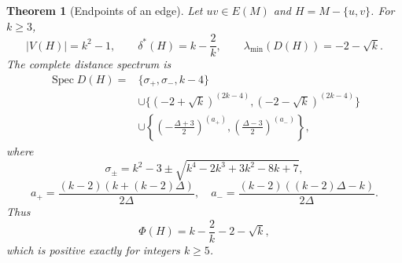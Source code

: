 \documentclass[a4paper,10pt,reqno]{amsart}
\theoremstyle{plain}
\newtheorem{theorem}{Theorem}[section]
\theoremstyle{definition}
\theoremstyle{remark}
\newcommand{\Spec}{\operatorname{Spec}}
\begin{document}
\begin{theorem}[Endpoints of an edge]\label{thm:edge-puncture}
Let \(uv\in E(M)\) and \(H=M-\{u,v\}\).  For \(k\ge3\),
\[
 |V(H)|=k^2-1,
 \qquad \delta^*(H)=k-\frac2k,
 \qquad \lambda_{\min}(D(H))=-2-\sqrt{k}.
\]
The complete distance spectrum is
\begin{align*}
\Spec D(H)={}&\{\sigma_+,\sigma_-,k-4\}\\
&\cup\{(-2+\sqrt{k})^{(2k-4)},(-2-\sqrt{k})^{(2k-4)}\}\\
&\cup\left\{\left(-\frac{\Delta+3}{2}\right)^{(a_+)},
\left(\frac{\Delta-3}{2}\right)^{(a_-)}\right\},
\end{align*}
where
\[
 \sigma_\pm=k^2-3\pm\sqrt{k^4-2k^3+3k^2-8k+7},
\]
\[
 a_+=\frac{(k-2)(k+(k-2)\Delta)}{2\Delta},
 \quad
 a_-=\frac{(k-2)((k-2)\Delta-k)}{2\Delta}.
\]
Thus
\[
 \Phi(H)=k-\frac2k-2-\sqrt{k},
\]
which is positive exactly for integers \(k\ge5\).
\end{theorem}
\end{document}

